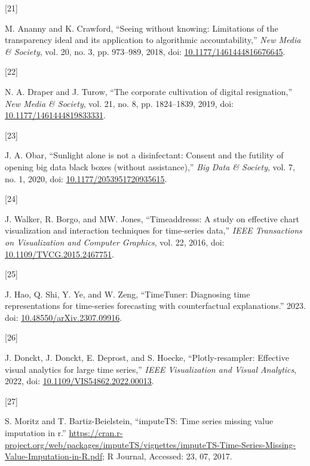\documentclass{article}
\newlength{\cslhangindent}
\newlength{\csllabelwidth}
\newlength{\cslentryspacingunit} %
\newenvironment{CSLReferences}[2] %
 {%
  \setlength{\parindent}{0pt}
  \ifodd #1
  \let\oldpar\par
  \def\par{\hangindent=\cslhangindent\oldpar}
  \fi
  \setlength{\parskip}{#2\cslentryspacingunit}
 }%
 {}
\newcommand{\CSLLeftMargin}[1]{\parbox[t]{\csllabelwidth}{#1}}
\newcommand{\CSLRightInline}[1]{\parbox[t]{\linewidth - \csllabelwidth}{#1}\break}
\begin{document}
\begin{CSLReferences}{0}{0}
\leavevmode{}%
\CSLLeftMargin{{[}21{]} }
\CSLRightInline{M. Ananny and K. Crawford, {``Seeing without knowing:
Limitations of the transparency ideal and its application to algorithmic
accountability,''} \emph{New Media \& Society}, vol. 20, no. 3, pp.
973--989, 2018, doi:
\href{https://doi.org/10.1177/1461444816676645}{10.1177/1461444816676645}.}

\leavevmode{}%
\CSLLeftMargin{{[}22{]} }
\CSLRightInline{N. A. Draper and J. Turow, {``The corporate cultivation
of digital resignation,''} \emph{New Media \& Society}, vol. 21, no. 8,
pp. 1824--1839, 2019, doi:
\href{https://doi.org/10.1177/1461444819833331}{10.1177/1461444819833331}.}

\leavevmode{}%
\CSLLeftMargin{{[}23{]} }
\CSLRightInline{J. A. Obar, {``Sunlight alone is not a disinfectant:
Consent and the futility of opening big data black boxes (without
assistance),''} \emph{Big Data \& Society}, vol. 7, no. 1, 2020, doi:
\href{https://doi.org/10.1177/2053951720935615}{10.1177/2053951720935615}.}

\leavevmode{}%
\CSLLeftMargin{{[}24{]} }
\CSLRightInline{J. Walker, R. Borgo, and MW. Jones, {``Timeaddresss: A
study on effective chart visualization and interaction techniques for
time-series data,''} \emph{IEEE Transactions on Visualization and
Computer Graphics}, vol. 22, 2016, doi:
\href{https://doi.org/10.1109/TVCG.2015.2467751}{10.1109/TVCG.2015.2467751}.}

\leavevmode{}%
\CSLLeftMargin{{[}25{]} }
\CSLRightInline{J. Hao, Q. Shi, Y. Ye, and W. Zeng, {``TimeTuner:
Diagnosing time representations for time-series forecasting with
counterfactual explanations.''} 2023. doi:
\href{https://doi.org/10.48550/arXiv.2307.09916}{10.48550/arXiv.2307.09916}.}

\leavevmode{}%
\CSLLeftMargin{{[}26{]} }
\CSLRightInline{J. Donckt, J. Donckt, E. Deprost, and S. Hoecke,
{``Plotly-resampler: Effective visual analytics for large time
series,''} \emph{IEEE Visualization and Visual Analytics}, 2022, doi:
\href{https://doi.org/10.1109/VIS54862.2022.00013}{10.1109/VIS54862.2022.00013}.}

\leavevmode{}%
\CSLLeftMargin{{[}27{]} }
\CSLRightInline{S. Moritz and T. Bartiz-Beielstein, {``imputeTS: Time
series missing value imputation in r.''}
\url{https://cran.r-project.org/web/packages/imputeTS/vignettes/imputeTS-Time-Series-Missing-Value-Imputation-in-R.pdf};
R Journal, Accessed: 23, 07, 2017.}


\end{CSLReferences}
\end{document}
